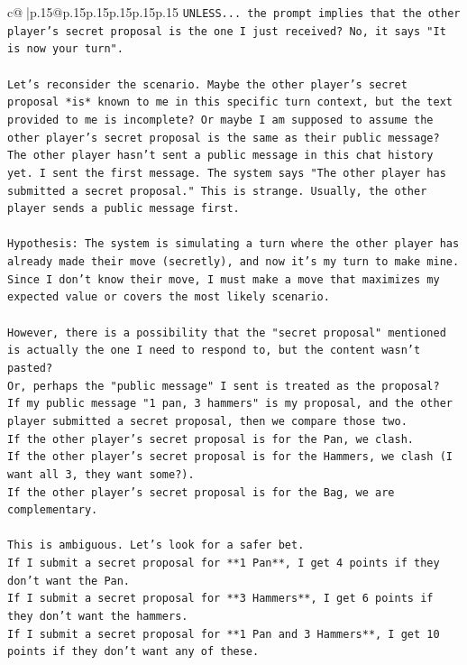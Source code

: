 \documentclass{article}
\begin{document}
{\begin{supertabular}{c@{$\;$}|p{.15\linewidth}@{}p{.15\linewidth}p{.15\linewidth}p{.15\linewidth}p{.15\linewidth}p{.15\linewidth}}
{{{\texttt{UNLESS... the prompt implies that the other player's secret proposal is the one I just received? No, it says "It is now your turn".} \\
\\ 
\texttt{Let's reconsider the scenario. Maybe the other player's secret proposal *is* known to me in this specific turn context, but the text provided to me is incomplete? Or maybe I am supposed to assume the other player's secret proposal is the same as their public message?} \\
\texttt{The other player hasn't sent a public message in this chat history yet. I sent the first message. The system says "The other player has submitted a secret proposal." This is strange. Usually, the other player sends a public message first.} \\
\\ 
\texttt{Hypothesis: The system is simulating a turn where the other player has already made their move (secretly), and now it's my turn to make mine. Since I don't know their move, I must make a move that maximizes my expected value or covers the most likely scenario.} \\
\\ 
\texttt{However, there is a possibility that the "secret proposal" mentioned is actually the one I need to respond to, but the content wasn't pasted?} \\
\texttt{Or, perhaps the "public message" I sent is treated as the proposal?} \\
\texttt{If my public message "1 pan, 3 hammers" is my proposal, and the other player submitted a secret proposal, then we compare those two.} \\
\texttt{If the other player's secret proposal is for the Pan, we clash.} \\
\texttt{If the other player's secret proposal is for the Hammers, we clash (I want all 3, they want some?).} \\
\texttt{If the other player's secret proposal is for the Bag, we are complementary.} \\
\\ 
\texttt{This is ambiguous. Let's look for a safer bet.} \\
\texttt{If I submit a secret proposal for **1 Pan**, I get 4 points if they don't want the Pan.} \\
\texttt{If I submit a secret proposal for **3 Hammers**, I get 6 points if they don't want the hammers.} \\
\texttt{If I submit a secret proposal for **1 Pan and 3 Hammers**, I get 10 points if they don't want any of these.} \\
}}}
\end{supertabular}}
\end{document}
